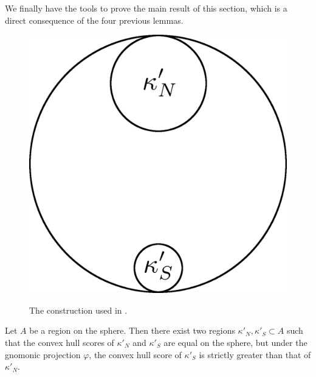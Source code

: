 We finally have the tools to prove the main result of this section,
which is a direct consequence of the four previous lemmas.

\begin{figure}
	\centering
	\includegraphics[width=.2\textwidth]{figs/differentkappa}\\[1.5em]
	\caption{ The construction used in . }
	\label{fig:caphr}
\end{figure}

\begin{theorem}
	\label{thm:convhull}
	Let $A$ be a region on the sphere.  Then there exist two regions $\kappa'_N,\kappa'_S\subset A$ such that the convex hull scores of $\kappa'_N$ and $\kappa'_S$ are equal on the sphere, but under the gnomonic projection $\varphi$, the convex hull score of $\kappa'_S$ is strictly greater than that of $\kappa'_N$. 
\end{theorem}

